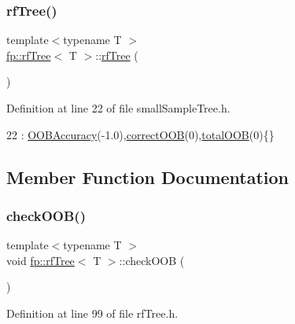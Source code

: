 \subsubsection{\texorpdfstring{rf\+Tree()}{rfTree()}\hspace{0.1cm}{\footnotesize\ttfamily [2/2]}}
{\footnotesize\ttfamily template$<$typename T $>$ \\
\hyperlink{classfp_1_1rfTree}{fp\+::rf\+Tree}$<$ T $>$\+::\hyperlink{classfp_1_1rfTree}{rf\+Tree} (\begin{DoxyParamCaption}{ }\end{DoxyParamCaption})\hspace{0.3cm}{\ttfamily [inline]}}



Definition at line 22 of file small\+Sample\+Tree.\+h.


\begin{DoxyCode}
22 : \hyperlink{classfp_1_1rfTree_a673f85d4df6f292a1819351c092a07e1}{OOBAccuracy}(-1.0),\hyperlink{classfp_1_1rfTree_a83832650bcea8d63cdcd480d9ddc6e6e}{correctOOB}(0),\hyperlink{classfp_1_1rfTree_aa200dc228adc20c12e514364d2b674df}{totalOOB}(0)\{\}
\end{DoxyCode}


\subsection{Member Function Documentation}
\mbox{\label{classfp_1_1rfTree_a45e47b318c90a1359840ab6161f20ab1}} 
\subsubsection{\texorpdfstring{check\+O\+O\+B()}{checkOOB()}\hspace{0.1cm}{\footnotesize\ttfamily [1/2]}}
{\footnotesize\ttfamily template$<$typename T $>$ \\
void \hyperlink{classfp_1_1rfTree}{fp\+::rf\+Tree}$<$ T $>$\+::check\+O\+OB (\begin{DoxyParamCaption}{ }\end{DoxyParamCaption})\hspace{0.3cm}{\ttfamily [inline]}}



Definition at line 99 of file rf\+Tree.\+h.


